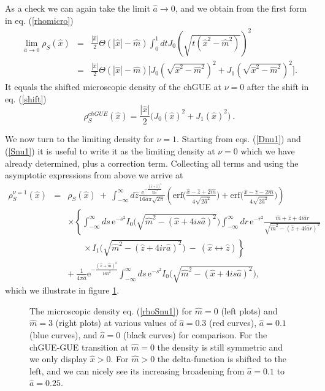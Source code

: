 \documentclass[11pt]{article}
\newcommand{\be}{\begin{equation}}
\newcommand{\ee}{\end{equation}}
\newcommand{\bea}{\begin{eqnarray}}
\newcommand{\eea}{\end{eqnarray}}
\newcommand{\nn}{\nonumber}
\newcommand{\e}{\mbox{e}}
\newcommand{\erf}{\mbox{erf}}
\newcommand{\hm}{\hat{m}}
\newcommand{\hz}{\hat{z}}
\newcommand{\hx}{\hat{x}}
\newcommand{\ha}{\hat{a}}
\begin{document}
As a check we can again take the limit $\ha\to0$, and we obtain from
the first form in eq. (\ref{rhomicro})
\bea
\lim_{\ha\to0}\rho_S(\hx)&=&\frac{|\hx|}{2}\Theta(|\hx|-\hm)\int_0^1dt
J_0\left(\sqrt{t(\hx^2-\hm^2)}\right)^2\nn\\ 
&=&\frac{|\hx|}{2}\Theta(|\hx|-\hm)\Big[J_0\left(\sqrt{\hx^2-\hm^2}\right)^2+
J_1\left(\sqrt{\hx^2-\hm^2}\right)^2\Big]. 
\eea
It equals the shifted microscopic density of the chGUE at $\nu=0$ after
the shift in eq. (\ref{shift})
\be
\rho_S^{chGU\!E}(\hx)=\frac{|\hx|}{2}\Big( J_0(\hx)^2+J_1(\hx)^2\Big)\ .
\label{rhoBes}
\ee



We now turn to the limiting density for $\nu=1$. Starting from
eqs. (\ref{Dnu1}) and (\ref{Snu1}) it is useful to write it as 
the limiting density at $\nu=0$ which we have already determined, plus a
correction term. Collecting all terms and using the asymptotic
expressions from above we arrive at
\bea
\rho_S^{\nu=1}(\hx)&=& \rho_S(\hx)\ +\ \int_{-\infty}^\infty
d\hat{z}\frac{\e^{-\frac{(\hx+\hz)^2}{32\ha^2}}}{16\ha\pi\sqrt{2\pi}}
\left(\erf\Big(\frac{\hx-\hz+2\hm}{4\sqrt{2\ha^2}}\Big)
+\erf\Big(\frac{\hx-\hz-2\hm}{4\sqrt{2\ha^2}}\Big)
\right)\nn\\
&&\times\left\{\int_{-\infty}^\infty ds\,
\e^{-s^2}I_0\Big( \sqrt{\hat{m}^2-(\hat{x}+4is\hat{a})^2}\Big)
\int_{-\infty}^\infty dr\,\e^{-r^2}{\frac{\hm+\hz+4i\ha
    r}{\sqrt{\hm^2-(\hz+4i\ha r)^2}}}
\right.\nn\\
&&\ \ \ \ \ \ \ \ \times\left.I
_1\Big( \sqrt{\hat{m}^2-(\hat{z}+4ir\hat{a})^2}\Big)
\ -\ (\hx\leftrightarrow\hz)
\right\}\nn\\
&&+\
\frac{1}{4\pi\ha}\e^{-\frac{(\hx+\hm)^2}{16\ha^2}}\int_{-\infty}^\infty
ds\,\e^{-s^2}I_0\Big( \sqrt{\hat{m}^2-(\hat{x}+4is\hat{a})^2}\Big) ,
\label{rhoSnu1}
\eea
which we illustrate in figure \ref{rhoSnu1plot}.
\begin{figure}[-h]
\centerline{
}
\caption{
The microscopic density eq. (\ref{rhoSnu1})
for $\hm=0$ (left plots) and $\hm=3$ (right plots)
at various values of $\ha=0.3$ (red curves), $\ha=0.1$
(blue curves), and $\ha=0$ (black curves) for comparison.
For the chGUE-GUE transition at $\hm=0$ the density is still
symmetric and we only display $\hx>0$. For $\hm>0$ the delta-function
is shifted to the left, and we can nicely see its increasing broadening
from $\ha=0.1$ to $\ha=0.25$.
}
\label{rhoSnu1plot}
\end{figure}
\end{document}
